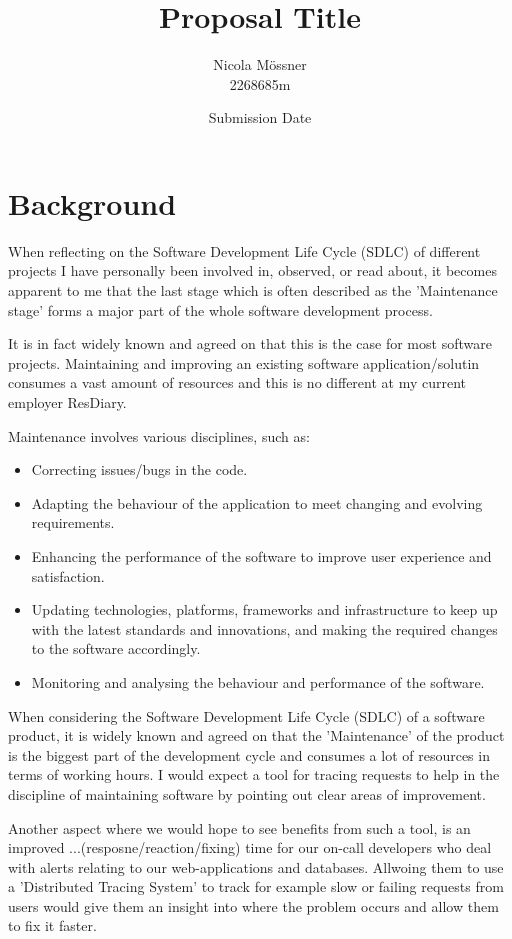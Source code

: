 \documentclass[11pt]{article}
\title{Proposal Title}
\author{Nicola M\"{o}ssner \\ 2268685m}
\date{Submission Date}
\begin{document}
\maketitle

\section{Background}


When reflecting on the Software Development Life Cycle (SDLC) of different projects I have personally been involved in, observed, or read about, it becomes apparent to me that the last stage which is often described as the 'Maintenance stage' forms a major part of the whole software development process.

It is in fact widely known and agreed on that this is the case for most software projects. Maintaining and improving an existing software application/solutin consumes a vast amount of resources and this is no different at my current employer ResDiary.

Maintenance involves various disciplines, such as:
\begin{itemize}
    \item Correcting issues/bugs in the code.
    \item Adapting the behaviour of the application to meet changing and evolving requirements.
    \item Enhancing the performance of the software to improve user experience and satisfaction.
    \item Updating technologies, platforms, frameworks and infrastructure to keep up with the latest standards and innovations, and making the required changes to the software accordingly.
    \item Monitoring and analysing the behaviour and performance of the software.
\end{itemize}


When considering the Software Development Life Cycle (SDLC) of a software product, it is widely known and agreed on that the 'Maintenance' of the product is the biggest part of the development cycle and consumes a lot of resources in terms of working hours.
I would expect a tool for tracing requests to help in the discipline of maintaining software by pointing out clear areas of improvement.

Another aspect where we would hope to see benefits from such a tool, is an improved ...(resposne/reaction/fixing) time for our on-call developers who deal with alerts relating to our web-applications and databases. Allwoing them to use a 'Distributed Tracing System' to track for example slow or failing requests from users would give them an insight into where the problem occurs and allow them to fix it faster.
\end{document}
